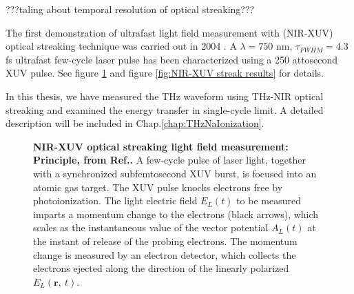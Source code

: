 ???taling about temporal resolution of optical streaking???

The first demonstration of ultrafast light field measurement with (NIR-XUV) optical streaking technique was carried out in 2004 \cite{fsFieldMeasurement2004}. A $\lambda = 750$ nm, $\tau_{\scriptscriptstyle FWHM} = 4.3$ fs ultrafast few-cycle laser pulse has been characterized using a 250 attosecond XUV pulse. See figure \ref{fig:NIR-XUV field measurement principle} and figure \ref{fig:NIR-XUV streak results} for details.

In this thesis, we have measured the THz waveform using THz-NIR optical streaking and examined the energy transfer in single-cycle limit. A detailed description will be included in Chap.\@ \ref{chap:THzNaIonization}.

\newpage
\begin{figure}[H]
	
	\centering
	\vspace{-3mm}
	\caption[NIR-XUV optical streaking light field measurement: Principle.]{{\bf NIR-XUV optical streaking light field measurement: Principle, from Ref.\@ \cite{fsFieldMeasurement2004}.} A few-cycle pulse of laser light, together with a synchronized subfemtosecond XUV burst, is focused into an atomic gas target. The XUV pulse knocks electrons free by photoionization. The light electric field $E_L(t)$ to be measured imparts a momentum change to the electrons (black arrows), which scales as the instantaneous value of the vector potential $A_L(t)$ at the instant of release of the probing electrons. The momentum change is measured by an electron detector, which collects the electrons ejected along the direction of the linearly polarized $E_L(\bm{r},\ t)$.}
	\label{fig:NIR-XUV field measurement principle}
	
\end{figure}

